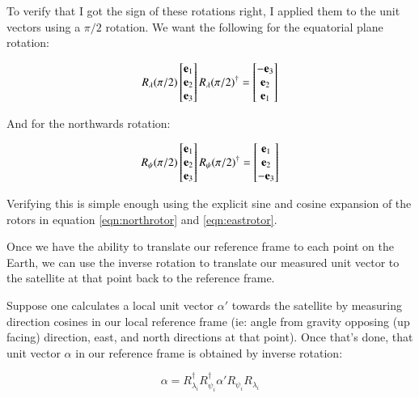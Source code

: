 \documentclass{article}      %
\begin{document}
To verify that I got the sign of these rotations right, I applied them to the unit vectors using a $\pi/2$ rotation.  We want the following for the equatorial plane rotation:

\begin{equation*}
R_{\lambda}(\pi/2)
\begin{bmatrix}
\mathbf{e}_1 \\
\mathbf{e}_2 \\
\mathbf{e}_3 \\
\end{bmatrix}
R_{\lambda}(\pi/2)^\dagger
=
\begin{bmatrix}
-\mathbf{e}_3 \\
\mathbf{e}_2 \\
\mathbf{e}_1 \\
\end{bmatrix}
\end{equation*}

And for the northwards rotation:

\begin{equation*}
R_{\psi}(\pi/2)
\begin{bmatrix}
\mathbf{e}_1 \\
\mathbf{e}_2 \\
\mathbf{e}_3 \\
\end{bmatrix}
R_{\psi}(\pi/2)^\dagger
=
\begin{bmatrix}
\mathbf{e}_1 \\
\mathbf{e}_2 \\
-\mathbf{e}_3 \\
\end{bmatrix}
\end{equation*}

Verifying this is simple enough using the explicit sine and cosine expansion of the rotors in equation \ref{eqn:northrotor} and \ref{eqn:eastrotor}.

Once we have the ability to translate our reference frame to each point on the Earth, we can use the inverse rotation to translate our measured unit vector
to the satellite at that point back to the reference frame.

Suppose one calculates a local unit vector $\alpha'$ towards the satellite by measuring direction cosines in our local reference frame (ie: angle from gravity opposing (up facing) direction, east, and north directions at that point).
Once that's done, that unit vector $\alpha$ in our reference frame is obtained by inverse rotation:

\begin{equation}
\alpha = R_{\lambda_i}^\dagger R_{\psi_i}^\dagger \alpha' R_{\psi_i} R_{\lambda_i}
\end{equation}
\end{document}
